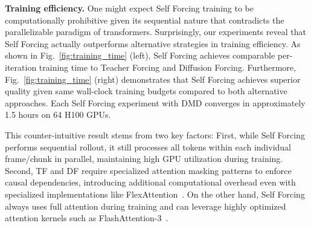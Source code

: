\documentclass{article}
\begin{document}


\noindent\textbf{Training efficiency.} One might expect Self Forcing training to be computationally prohibitive given its sequential nature that contradicts the parallelizable paradigm of transformers. Surprisingly, our experiments reveal that Self Forcing actually outperforms alternative strategies in training efficiency. As shown in Fig.~\ref{fig:training_time} (left), Self Forcing achieves comparable per-iteration training time to Teacher Forcing and Diffusion Forcing. Furthermore, Fig.~\ref{fig:training_time} (right) demonstrates that Self Forcing achieves superior quality given same wall-clock training budgets compared to both alternative approaches. Each Self Forcing experiment with DMD converges in approximately 1.5 hours on 64 H100 GPUs.

This counter-intuitive result stems from two key factors: First, while Self Forcing performs sequential rollout, it still processes all tokens within each individual frame/chunk in parallel, maintaining high GPU utilization during training. Second, TF and DF require specialized attention masking patterns to enforce causal dependencies, introducing additional computational overhead even with specialized implementations like FlexAttention~\cite{Dong2024FlexAA}.
On the other hand, Self Forcing always uses full attention during training and can leverage highly optimized attention kernels such as FlashAttention-3~\cite{shah2024flashattention}.
\end{document}
